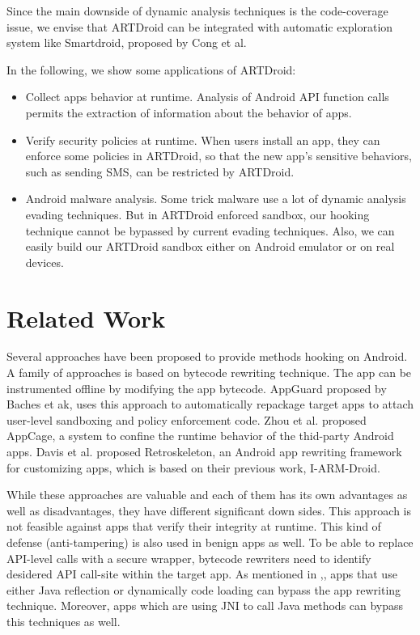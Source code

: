 Since the main downside of dynamic analysis techniques is the code-coverage issue, we envise that ARTDroid can be integrated with automatic exploration system like Smartdroid\cite{Zheng:2012}, proposed by Cong et al. 


In the following, we show some applications of ARTDroid:

\begin{itemize}
\item Collect apps behavior at runtime. Analysis of Android API function calls permits the extraction of information about the behavior of apps.
\item Verify security policies at runtime. When users install an app, they can enforce some policies in ARTDroid, so that the new app's sensitive behaviors, such as sending SMS, can be restricted by ARTDroid.
\item Android malware analysis. Some trick malware use a lot of dynamic analysis evading techniques. But in ARTDroid enforced sandbox, our hooking technique cannot be bypassed by current evading techniques. Also, we can easily build our ARTDroid sandbox either on Android emulator or on real devices.
\end{itemize}

\section{Related Work}
\label{sec:related}
Several approaches have been proposed to provide methods hooking on Android. A family of approaches is based on bytecode rewriting technique. The app can be instrumented offline by modifying the app bytecode. AppGuard\cite{backes2013appguard} proposed by Baches et ak, uses this approach to automatically repackage target apps to attach user-level sandboxing and policy enforcement code. Zhou et al. proposed AppCage\cite{zhou2015hybrid}, a system to confine the runtime behavior of the thid-party Android apps. Davis et al. proposed Retroskeleton\cite{davis2013retroskeleton}, an Android app rewriting framework for customizing apps, which is based on their previous work, I-ARM-Droid\cite{davis2012arm}. 


While these approaches are valuable and each of them has its own advantages as well as disadvantages, they have different significant down sides. This approach is not feasible against apps that verify their integrity at runtime. This kind of defense (anti-tampering) is also used in benign apps as well. To be able to replace API-level calls with a secure wrapper, bytecode rewriters need to identify desidered API call-site within the target app. As mentioned in \cite{hao2013effectiveness},\cite{zhauniarovich2015stadyna}, apps that use either Java reflection or dynamically code loading can bypass the app rewriting technique. Moreover, apps which are using JNI to call Java methods can bypass this techniques as well.

